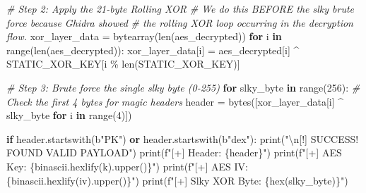 \documentclass[
]{article}
\newenvironment{Shaded}{}{}
\newcommand{\BuiltInTok}[1]{\textcolor[rgb]{0.00,0.50,0.00}{#1}}
\newcommand{\CharTok}[1]{\textcolor[rgb]{0.25,0.44,0.63}{#1}}
\newcommand{\CommentTok}[1]{\textcolor[rgb]{0.38,0.63,0.69}{\textit{#1}}}
\newcommand{\ControlFlowTok}[1]{\textcolor[rgb]{0.00,0.44,0.13}{\textbf{#1}}}
\newcommand{\DecValTok}[1]{\textcolor[rgb]{0.25,0.63,0.44}{#1}}
\newcommand{\KeywordTok}[1]{\textcolor[rgb]{0.00,0.44,0.13}{\textbf{#1}}}
\newcommand{\NormalTok}[1]{#1}
\newcommand{\OperatorTok}[1]{\textcolor[rgb]{0.40,0.40,0.40}{#1}}
\newcommand{\SpecialCharTok}[1]{\textcolor[rgb]{0.25,0.44,0.63}{#1}}
\newcommand{\SpecialStringTok}[1]{\textcolor[rgb]{0.73,0.40,0.53}{#1}}
\newcommand{\StringTok}[1]{\textcolor[rgb]{0.25,0.44,0.63}{#1}}
\begin{document}
\begin{Shaded}
\begin{Highlighting}[]
        \CommentTok{\# Step 2: Apply the 21{-}byte Rolling XOR}
        \CommentTok{\# We do this BEFORE the slky brute force because Ghidra showed}
        \CommentTok{\# the rolling XOR loop occurring in the decryption flow.}
\NormalTok{        xor\_layer\_data }\OperatorTok{=} \BuiltInTok{bytearray}\NormalTok{(}\BuiltInTok{len}\NormalTok{(aes\_decrypted))}
        \ControlFlowTok{for}\NormalTok{ i }\KeywordTok{in} \BuiltInTok{range}\NormalTok{(}\BuiltInTok{len}\NormalTok{(aes\_decrypted)):}
\NormalTok{            xor\_layer\_data[i] }\OperatorTok{=}\NormalTok{ aes\_decrypted[i] }\OperatorTok{\^{}}\NormalTok{ STATIC\_XOR\_KEY[i }\OperatorTok{\%} \BuiltInTok{len}\NormalTok{(STATIC\_XOR\_KEY)]}

        \CommentTok{\# Step 3: Brute force the single \textquotesingle{}slky\textquotesingle{} byte (0{-}255)}
        \ControlFlowTok{for}\NormalTok{ slky\_byte }\KeywordTok{in} \BuiltInTok{range}\NormalTok{(}\DecValTok{256}\NormalTok{):}
            \CommentTok{\# Check the first 4 bytes for magic headers}
\NormalTok{            header }\OperatorTok{=} \BuiltInTok{bytes}\NormalTok{([xor\_layer\_data[i] }\OperatorTok{\^{}}\NormalTok{ slky\_byte }\ControlFlowTok{for}\NormalTok{ i }\KeywordTok{in} \BuiltInTok{range}\NormalTok{(}\DecValTok{4}\NormalTok{)])}

            \ControlFlowTok{if}\NormalTok{ header.startswith(}\StringTok{b"PK"}\NormalTok{) }\KeywordTok{or}\NormalTok{ header.startswith(}\StringTok{b"dex"}\NormalTok{):}
                \BuiltInTok{print}\NormalTok{(}\StringTok{"}\CharTok{\textbackslash{}n}\StringTok{[!] SUCCESS! FOUND VALID PAYLOAD"}\NormalTok{)}
                \BuiltInTok{print}\NormalTok{(}\SpecialStringTok{f"[+] Header: }\SpecialCharTok{\{}\NormalTok{header}\SpecialCharTok{\}}\SpecialStringTok{"}\NormalTok{)}
                \BuiltInTok{print}\NormalTok{(}\SpecialStringTok{f"[+] AES Key: }\SpecialCharTok{\{}\NormalTok{binascii}\SpecialCharTok{.}\NormalTok{hexlify(k)}\SpecialCharTok{.}\NormalTok{upper()}\SpecialCharTok{\}}\SpecialStringTok{"}\NormalTok{)}
                \BuiltInTok{print}\NormalTok{(}\SpecialStringTok{f"[+] AES IV:  }\SpecialCharTok{\{}\NormalTok{binascii}\SpecialCharTok{.}\NormalTok{hexlify(iv)}\SpecialCharTok{.}\NormalTok{upper()}\SpecialCharTok{\}}\SpecialStringTok{"}\NormalTok{)}
                \BuiltInTok{print}\NormalTok{(}\SpecialStringTok{f"[+] Slky XOR Byte: }\SpecialCharTok{\{}\BuiltInTok{hex}\NormalTok{(slky\_byte)}\SpecialCharTok{\}}\SpecialStringTok{"}\NormalTok{)}


\end{Highlighting}
\end{Shaded}
\end{document}
